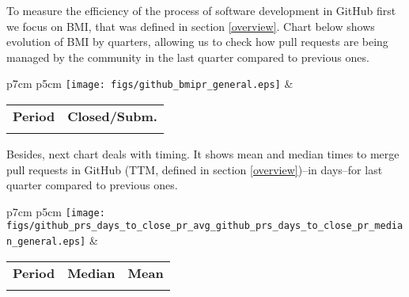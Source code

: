 To measure the efficiency of the process of software development in GitHub first we focus on BMI, that was defined in section \ref{overview}. Chart below shows evolution of BMI by quarters, allowing us to check how pull requests are being managed by the community in the last quarter compared to previous ones.

\begin{tabular}{p{7cm} p{5cm}}
	\vspace{0pt} 
	\texttt{[image: figs/github\_bmipr\_general.eps]}
	& 
	\vspace{0pt}
	\begin{tabular}{l|l}%
		\bfseries Period & \bfseries Closed/Subm. %
		\csvreader[head to column names]{data/github_prs_bmipr_general.csv}{}%
		{\\ & \bmipr}
	\end{tabular}
\end{tabular}

Besides, next chart deals with timing. It shows mean and median times to merge pull requests in GitHub (TTM, defined in section \ref{overview})--in days--for last quarter compared to previous ones.


\begin{tabular}{p{7cm} p{5cm}}
	\vspace{0pt} 
	\texttt{[image: figs/github\_prs\_days\_to\_close\_pr\_avg\_github\_prs\_days\_to\_close\_pr\_median\_general.eps]}
	& 
	\vspace{0pt}
	\begin{tabular}{l|r|r|}%
		\bfseries Period & \bfseries Median & \bfseries Mean %
		\csvreader[head to column names]{data/github_prs_days_to_close_pr_avg_github_prs_days_to_close_pr_median_general.csv}{}%
		{\\ & \daystocloseprmedian & \daystoclosepravg}
	\end{tabular}
\end{tabular}
